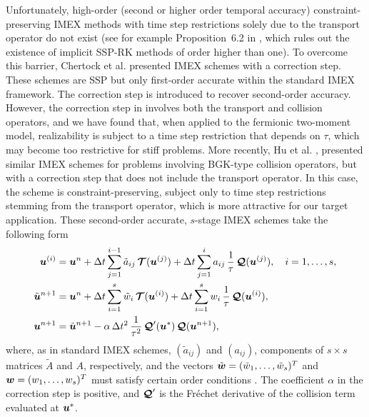 Unfortunately, high-order (second or higher order temporal accuracy) constraint-preserving IMEX methods with time step restrictions solely due to the transport operator do not exist (see for example Proposition~6.2 in \cite{gottlieb_etal_2001}, which rules out the existence of implicit SSP-RK methods of order higher than one).  
To overcome this barrier, Chertock et al. \cite{chertock_etal_2015} presented IMEX schemes with a correction step.  
These schemes are SSP but only first-order accurate within the standard IMEX framework.  
The correction step is introduced to recover second-order accuracy.  
However, the correction step in \cite{chertock_etal_2015} involves both the transport and collision operators, and we have found that, when applied to the fermionic two-moment model, realizability is subject to a time step restriction that depends on $\tau$, which may become too restrictive for stiff problems.  
More recently, Hu et al. \cite{hu_etal_2018}, presented similar IMEX schemes for problems involving BGK-type collision operators, but with a correction step that does not include the transport operator.  
In this case, the scheme is constraint-preserving, subject only to time step restrictions stemming from the transport operator, which is more attractive for our target application.  
These second-order accurate, $s$-stage IMEX schemes take the following form \cite{hu_etal_2018}
\begin{align}
  \boldsymbol{u}^{(i)}
  &=\boldsymbol{u}^{n}
  +\Delta t\sum_{j=1}^{i-1}\tilde{a}_{ij}\,\boldsymbol{\mathcal{T}}(\boldsymbol{u}^{(j)})
  +\Delta t\sum_{j=1}^{i}a_{ij}\,\frac{1}{\tau}\,\boldsymbol{\mathcal{Q}}(\boldsymbol{u}^{(j)}),
  \quad i=1,\ldots,s, \label{imexStages} \\
  \tilde{\boldsymbol{u}}^{n+1}
  &=\boldsymbol{u}^{n}
  +\Delta t\sum_{i=1}^{s}\tilde{w}_{i}\,\boldsymbol{\mathcal{T}}(\boldsymbol{u}^{(i)})
  +\Delta t\sum_{i=1}^{s}w_{i}\,\frac{1}{\tau}\,\boldsymbol{\mathcal{Q}}(\boldsymbol{u}^{(i)}), \label{imexIntermediate} \\
  \boldsymbol{u}^{n+1}
  &=\tilde{\boldsymbol{u}}^{n+1}-\alpha\,\Delta t^{2}\,\frac{1}{\tau^{2}}\,\boldsymbol{\mathcal{Q}}'(\boldsymbol{u}^{*})\,\boldsymbol{\mathcal{Q}}(\boldsymbol{u}^{n+1}), \label{eq:imexCorrection}
\end{align}
where, as in standard IMEX schemes, $(\tilde{a}_{ij})$ and $(a_{ij})$, components of $s\times s$ matrices $\tilde{A}$ and $A$, respectively, and the vectors $\tilde{\boldsymbol{w}}=(\tilde{w}_{1},\ldots,\tilde{w}_{s})^{T}$ and $\boldsymbol{w}=(w_{1},\ldots,w_{s})^{T}$ must satisfy certain order conditions \cite{pareschiRusso_2005}.  
The coefficient $\alpha$ in the correction step is positive, and $\boldsymbol{\mathcal{Q}}'$ is the Fr{\'e}chet derivative of the collision term evaluated at $\boldsymbol{u}^{*}$.  
